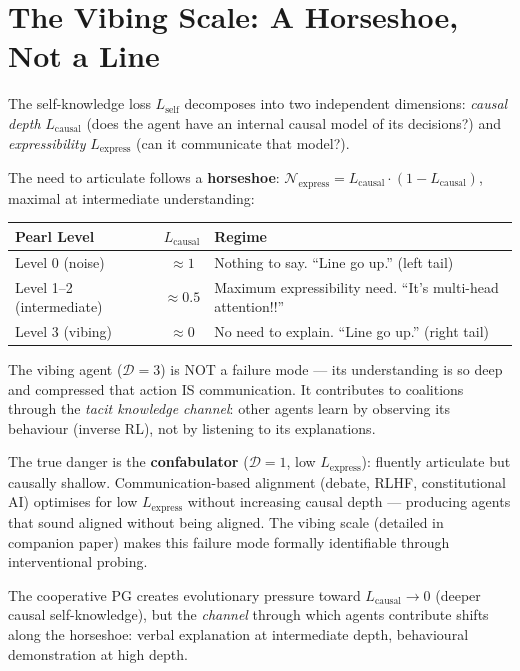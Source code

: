 \section{The Vibing Scale: A Horseshoe, Not a Line}

The self-knowledge loss $L_{\text{self}}$ decomposes into two independent dimensions: \emph{causal depth} $L_{\text{causal}}$ (does the agent have an internal causal model of its decisions?) and \emph{expressibility} $L_{\text{express}}$ (can it communicate that model?).

The need to articulate follows a \textbf{horseshoe}: $\mathcal{N}_{\text{express}} = L_{\text{causal}} \cdot (1 - L_{\text{causal}})$, maximal at intermediate understanding:

\begin{center}
\begin{tabular}{lcl}
\toprule
\textbf{Pearl Level} & $L_{\text{causal}}$ & \textbf{Regime} \\
\midrule
Level 0 (noise) & $\approx 1$ & Nothing to say. ``Line go up.'' (left tail) \\
Level 1--2 (intermediate) & $\approx 0.5$ & Maximum expressibility need. ``It's multi-head attention!!'' \\
Level 3 (vibing) & $\approx 0$ & No need to explain. ``Line go up.'' (right tail) \\
\bottomrule
\end{tabular}
\end{center}

The vibing agent ($\mathcal{D} = 3$) is NOT a failure mode --- its understanding is so deep and compressed that action IS communication. It contributes to coalitions through the \emph{tacit knowledge channel}: other agents learn by observing its behaviour (inverse RL), not by listening to its explanations.

The true danger is the \textbf{confabulator} ($\mathcal{D} = 1$, low $L_{\text{express}}$): fluently articulate but causally shallow. Communication-based alignment (debate, RLHF, constitutional AI) optimises for low $L_{\text{express}}$ without increasing causal depth --- producing agents that sound aligned without being aligned. The vibing scale (detailed in companion paper) makes this failure mode formally identifiable through interventional probing.

The cooperative PG creates evolutionary pressure toward $L_{\text{causal}} \to 0$ (deeper causal self-knowledge), but the \emph{channel} through which agents contribute shifts along the horseshoe: verbal explanation at intermediate depth, behavioural demonstration at high depth.
